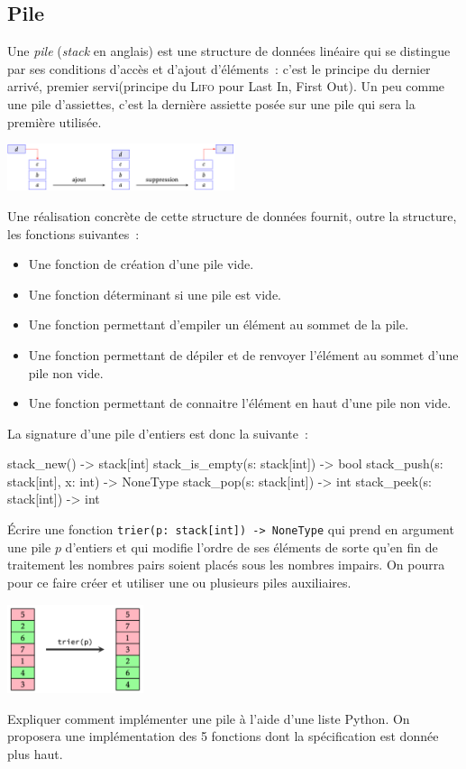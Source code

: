 \documentclass{magnoliaold}
\begin{document}
\subsection{Pile}

Une \emph{pile} (\emph{stack} en anglais) est une structure de données linéaire qui se distingue par
ses conditions d'accès et d'ajout d'éléments~: c'est le principe du
\og dernier arrivé, premier servi\fg  (principe du \textsc{Lifo} pour Last In, First Out).
Un peu comme une pile d'assiettes, c'est la dernière assiette posée sur une pile
qui sera la première utilisée.

\begin{center}
\includegraphics[width=0.5\textwidth]{../../Commun/Images/python-cours-tableau-1.pdf}
\end{center}

Une réalisation concrète de cette structure de données fournit, outre la structure, les
fonctions suivantes~:
\begin{itemize}
\item Une fonction de création d'une pile vide.
\item Une fonction déterminant si une pile est vide.
\item Une fonction permettant d'empiler un élément au sommet de la pile.
\item Une fonction permettant de dépiler et de renvoyer l'élément au sommet d'une pile
  non vide.
\item Une fonction permettant de connaitre l'élément en haut d'une pile non vide.
\end{itemize}
La signature d'une pile d'entiers est donc la suivante~:
\begin{pythoncode}
stack_new() -> stack[int]
stack_is_empty(s: stack[int]) -> bool
stack_push(s: stack[int], x: int) -> NoneType
stack_pop(s: stack[int]) -> int
stack_peek(s: stack[int]) -> int
\end{pythoncode}

\begin{exos}
\exo Écrire une fonction \verb!trier(p: stack[int]) -> NoneType! qui prend en argument une pile $p$
  d'entiers et qui modifie l'ordre de ses éléments de sorte qu'en fin de traitement les
  nombres pairs soient placés sous les nombres impairs. On pourra pour ce faire créer et
  utiliser une ou plusieurs piles auxiliaires.
\begin{center}
\includegraphics[width=0.3\textwidth]{../../Commun/Images/python-exos-tableau-1.pdf}
\end{center}
\exo Expliquer comment implémenter une pile à l'aide d'une liste Python. On proposera une
  implémentation des 5 fonctions dont la spécification est donnée plus haut.
\end{exos}
\end{document}
